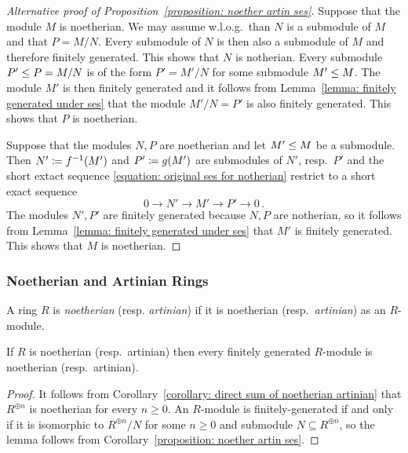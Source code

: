 \begin{proof}[Alternative proof of Proposition~\ref{proposition: noether artin ses}]
  Suppose that the module $M$ is noetherian.
  We may assume w.l.o.g.\ than $N$ is a submodule of $M$ and that $P = M/N$.
  Every submodule of $N$ is then also a submodule of $M$ and therefore finitely generated.
  This shows that $N$ is notherian.
  Every submodule $P' \leq P = M/N$ is of the form $P' = M'/N$ for some submodule $M' \leq M$.
  The module $M'$ is then finitely generated and it follows from Lemma~\ref{lemma: finitely generated under ses} that the module $M'/N = P'$ is also finitely generated.
  This shows that $P$ is noetherian.

  Suppose that the modules $N, P$ are noetherian and let $M' \leq M$ be a submodule.
  Then $N' \coloneqq f^{-1}(M')$ and $P' \coloneqq g(M')$ are submodules of $N'$, resp.\ $P'$ and the short extact sequence \eqref{equation: original ses for notherian} restrict to a short exact sequence
  \[
        0
    \to N'
    \to M'
    \to P'
    \to 0 \,.
  \]
  The modules $N', P'$ are finitely generated because $N, P$ are notherian, so it follows from Lemma~\ref{lemma: finitely generated under ses} that $M'$ is finitely generated.
  This shows that $M$ is noetherian.
\end{proof}





\subsubsection{Noetherian and Artinian Rings}


\begin{definition}
  A ring $R$ is \emph{noetherian} (resp. \emph{artinian}) if it is noetherian (resp.\ \emph{artinian}) as an $R$-module.
\end{definition}


\begin{lemma}
  \label{lemma: finitely generated over notherian artinian rings}
  If $R$ is noetherian (resp.\ artinian) then every finitely generated $R$-module is noetherian (resp.\ artinian).
\end{lemma}


\begin{proof}
  It follows from Corollary~\ref{corollary: direct sum of noetherian artinian} that $R^{\oplus n}$ is noetherian for every $n \geq 0$.
  An $R$-module is finitely-generated if and only if it is isomorphic to $R^{\oplus n}/N$ for some $n \geq 0$ and submodule $N \subseteq R^{\oplus n}$, so the lemma follows from Corollary~\ref{proposition: noether artin ses}.
\end{proof}


